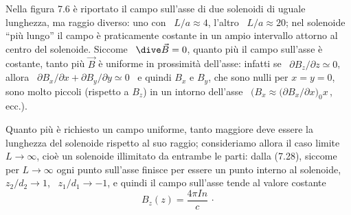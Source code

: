 Nella figura 7.6 \`e riportato il campo sull'asse di due solenoidi di uguale
lunghezza, ma raggio diverso: uno con \ $L/a\approx4$, l'altro \ $L/a\approx20$;
nel solenoide ``pi\`u lungo'' il campo \`e praticamente costante in un ampio
intervallo attorno al centro del solenoide.
Siccome \ $\dive\vec B=0$, quanto pi\`u il campo sull'asse \`e costante, tanto
pi\`u $\vec B$ \`e uniforme in prossimit\`a dell'asse: infatti se
\ $\partial B_z/\partial z\simeq0$, allora
\ $\partial B_x/\partial x+\partial B_y/\partial y\simeq0$ \ e quindi $B_x$ e
$B_y$, che sono nulli per $x=y=0$, sono molto piccoli (rispetto a $B_z$) in un
intorno dell'asse \ $\big(B_x\approx\big(\partial B_x/\partial x\big)_0x$\,,
ecc.).

Quanto pi\`u \`e richiesto un campo uniforme, tanto maggiore deve essere la
lunghezza del solenoide rispetto al suo raggio; consideriamo allora il caso
limite $L\to\infty$, cio\`e un solenoide illimitato da entrambe le parti: dalla
(7.28), siccome per $L\to\infty$ ogni punto sull'asse finisce per essere un
punto interno al solenoide, \ $z_2/d_2\to1$, \ $z_1/d_1\to-1$, e quindi il campo
sull'asse tende al valore costante
\begin{equation}
  B_z(z)=\frac{4\pi In}{c}\,\cdot
  \tag{7.29}
\end{equation}


